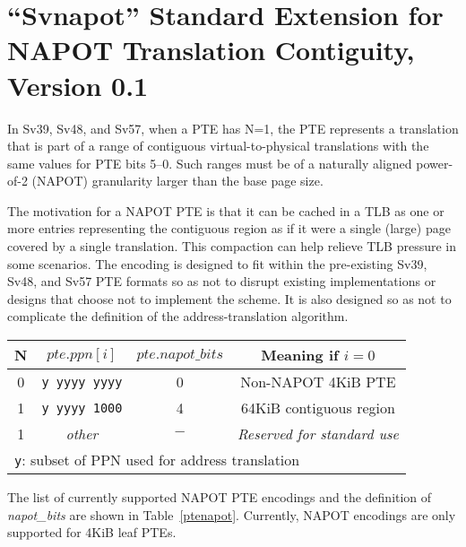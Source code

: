 \chapter{``Svnapot'' Standard Extension for NAPOT Translation Contiguity, Version 0.1}
\label{svnapot}

In Sv39, Sv48, and Sv57, when a PTE has N=1, the PTE represents a
translation that is part of a range of contiguous virtual-to-physical
translations with the same values for PTE bits 5--0.  Such ranges must be of a
naturally aligned power-of-2 (NAPOT) granularity larger than the base page
size.

\begin{commentary}
  The motivation for a NAPOT PTE is that it can be cached in a TLB as one or
  more entries representing the contiguous region as if it were a single
  (large) page covered by a single translation.  This compaction can help
  relieve TLB pressure in some scenarios.  The encoding is designed to fit
  within the pre-existing Sv39, Sv48, and Sv57 PTE formats so as not to disrupt
  existing implementations or designs that choose not to implement the scheme.
  It is also designed so as not to complicate the definition of the
  address-translation algorithm.
\end{commentary}

\begin{table*}[h!]
\begin{center}
\begin{tabular}{|c|c||c|c|}
\hline
N & $pte.ppn[i]$      & $pte.napot\_bits$ & Meaning if $i=0$         \\
\hline
0 & {\tt y~yyyy~yyyy} & 0                 &  Non-NAPOT 4KiB PTE      \\
1 & {\tt y~yyyy~1000} & 4                 &  64KiB contiguous region \\
1 & {\em other}       & $-$               &  {\em Reserved for standard use} \\
\hline
\multicolumn{4}{l}{{\tt y}: subset of PPN used for address translation} \\
\end{tabular}
\end{center}
\caption{NAPOT Contiguous Translation Encodings}
\label{ptenapot}
\end{table*}

The list of currently supported NAPOT PTE encodings and the definition of {\em
napot\_bits} are shown in Table~\ref{ptenapot}.  Currently, NAPOT encodings are
only supported for 4KiB leaf PTEs.

